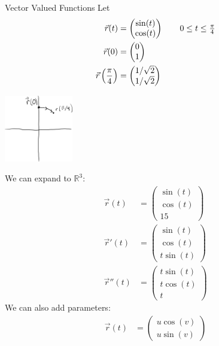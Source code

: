 \documentclass[8pt]{extarticle}
\newcommand{\R}{\mathbb{R}}
\begin{document}
  \begin{problem}{Vector Valued Functions}
    Let
    \begin{align*}
      \vec{r}(t) &= \begin{pmatrix}\sin(t) \\ \cos(t)\end{pmatrix} \tag*{$0 \leq t \leq \frac{\pi}{4}$}\\
      \vec{r}(0) &= \begin{pmatrix}0\\1\end{pmatrix}\\
      \vec{r}\left(\frac{\pi}{4}\right) &= \begin{pmatrix}1/\sqrt{2}\\1/\sqrt{2}\end{pmatrix}
    \end{align*}
    \begin{center}
      \includegraphics[width=3cm]{images/parameterized_1.png}
    \end{center}
    We can expand to $\R^3$:
    \begin{align*}
      \vec{r}(t) &= \begin{pmatrix}\sin(t)\\\cos(t)\\15\end{pmatrix}\tag*{Circle at $z = 15$}\\
      \vec{r}'(t) &= \begin{pmatrix}\sin(t) \\ \cos(t) \\ t\sin(t)\end{pmatrix} \tag*{Helix}\\
      \vec{r}''(t) &= \begin{pmatrix}t\sin(t)\\ t\cos(t) \\ t\end{pmatrix} \tag*{Conical Helix}
    \end{align*}
    We can also add parameters:
    \begin{align*}
      \vec{r}(t) &= \begin{pmatrix}u\cos(v) \\ u\sin(v)\end{pmatrix} \tag*{Disc}
    \end{align*}
  \end{problem}
\end{document}
